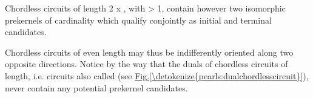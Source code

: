 \documentclass[a4paper,12pt,english]{sphinxhowto}
\begin{document}
\sphinxAtStartPar
Chordless circuits of  length 2 x , with  \textgreater{} 1, contain however two isomorphic prekernels of cardinality  which qualify conjointly as initial and terminal candidates.

\begin{sphinxVerbatim}[commandchars=\\\{\},numbers=left,firstnumber=1,stepnumber=1]
  \PYG{p}{[}\PYG{p}{]}
\end{sphinxVerbatim}

\sphinxAtStartPar
Chordless circuits of even length may thus be indifferently oriented along two opposite directions. Notice by the way that the duals of  chordless circuits of    length, i.e.  circuits also called  (see \hyperref[\detokenize{pearls:dualchordlesscircuit}]{Fig.\@ \ref{\detokenize{pearls:dualchordlesscircuit}}}), never contain any potential prekernel candidates.
\end{document}
